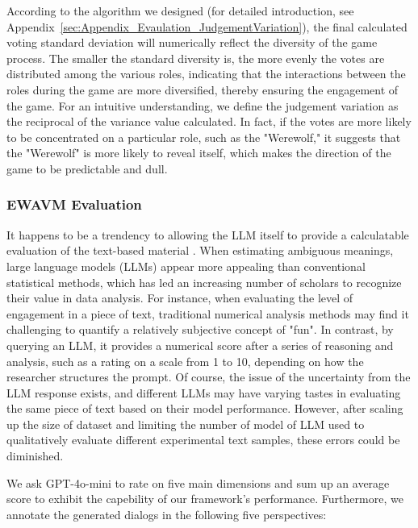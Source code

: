 \documentclass[11pt]{article}
\begin{document}
According to the algorithm we designed (for detailed introduction, see Appendix~\ref{sec:Appendix_Evaulation_JudgementVariation}), the final calculated voting standard deviation will numerically reflect the diversity of the game process. The smaller the standard diversity is, the more evenly the votes are distributed among the various roles, indicating that the interactions between the roles during the game are more diversified, thereby ensuring the engagement of the game. For an intuitive understanding, we define the judgement variation as the reciprocal of the variance value calculated. In fact, if the votes are more likely to be concentrated on a particular role, such as the "Werewolf," it suggests that the "Werewolf" is more likely to reveal itself, which makes the direction of the game to be predictable and dull.


\subsubsection{EWAVM Evaluation} \label{sec:Evaluation_EWAVM}

It happens to be a trendency to allowing the LLM itself to provide a calculatable evaluation of the text-based material \citep{shao2023character,wang2024incharacter}. When estimating ambiguous meanings, large language models (LLMs) appear more appealing than conventional statistical methods, which has led an increasing number of scholars to recognize their value in data analysis. For instance, when evaluating the level of engagement in a piece of text, traditional numerical analysis methods may find it challenging to quantify a relatively subjective concept of "fun". In contrast, by querying an LLM, it provides a numerical score after a series of reasoning and analysis, such as a rating on a scale from 1 to 10, depending on how the researcher structures the prompt. Of course, the issue of the uncertainty from the LLM response exists, and different LLMs may have varying tastes in evaluating the same piece of text based on their model performance. However, after scaling up the size of dataset and limiting the number of model of LLM used to qualitatively evaluate different experimental text samples, these errors could be diminished.


We ask GPT-4o-mini to rate on five main dimensions and sum up an average score to exhibit the capebility of our framework's performance. Furthermore, we annotate the generated dialogs in the following five perspectives:
\end{document}
